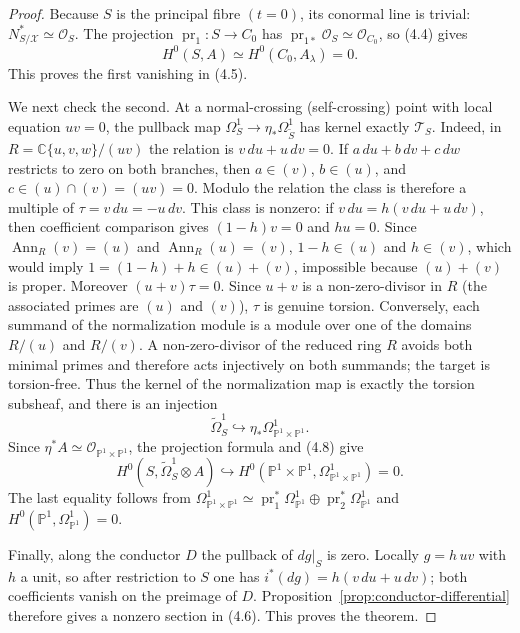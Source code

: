 \documentclass[11pt]{amsart}
\newcommand{\C}{\mathbb C}
\renewcommand{\P}{\mathbb P}
\newcommand{\cO}{\mathcal O}
\theoremstyle{plain}
\theoremstyle{definition}
\theoremstyle{remark}
\begin{document}
\begin{proof}
Because $S$ is the principal fibre $(t=0)$, its conormal line is trivial:
\(N^*_{S/\mathcal X}\simeq\cO_S\).  The projection
\(\operatorname{pr}_1:S\to C_0\) has
\(\operatorname{pr}_{1*}\cO_S\simeq\cO_{C_0}\), so (4.4) gives
\[
 H^0(S,A)\simeq H^0(C_0,A_\lambda)=0.
 \tag{4.7}
\]
This proves the first vanishing in (4.5).

We next check the second.  At a normal-crossing (self-crossing) point with local equation
\(uv=0\), the pullback map
\(\Omega^1_S\to\eta_*\Omega^1_{\widetilde S}\) has kernel exactly
\(\mathscr T_S\).  Indeed, in
\(R=\C\{u,v,w\}/(uv)\) the relation is
\(v\,du+u\,dv=0\).  If
\(a\,du+b\,dv+c\,dw\) restricts to zero on both branches, then
\(a\in(v)\), \(b\in(u)\), and
\(c\in(u)\cap(v)=(uv)=0\).  Modulo the relation the class is therefore a
multiple of $\tau=v\,du=-u\,dv$.  This class is nonzero: if
\(v\,du=h(v\,du+u\,dv)\), then coefficient comparison gives
  \((1-h)v=0\) and $hu=0$.  Since
\(\operatorname{Ann}_R(v)=(u)\) and \(\operatorname{Ann}_R(u)=(v)\),
\(1-h\in(u)\) and \(h\in(v)\), which would imply
\(1=(1-h)+h\in(u)+(v)\), impossible because $(u)+(v)$ is proper.
Moreover $(u+v)\tau=0$.  Since $u+v$ is a non-zero-divisor in
$R$ (the associated primes are $(u)$ and $(v)$), $\tau$ is genuine
torsion.
Conversely, each summand of the normalization module is a module over one of
the domains $R/(u)$ and $R/(v)$.  A non-zero-divisor of the reduced ring $R$
avoids both minimal primes and therefore acts injectively on both summands;
the target is torsion-free.  Thus the kernel of the normalization map is
exactly the torsion subsheaf, and there is an injection
\[
 \widetilde\Omega^1_S\hookrightarrow\eta_*\Omega^1_{\P^1\times\P^1}.
 \tag{4.8}
\]
Since $\eta^*A\simeq\cO_{\P^1\times\P^1}$, the projection formula and (4.8)
give
\[
 H^0(S,\widetilde\Omega^1_S\otimes A)
 \hookrightarrow
 H^0(\P^1\times\P^1,\Omega^1_{\P^1\times\P^1})=0.
 \tag{4.9}
\]
The last equality follows from
\(\Omega^1_{\P^1\times\P^1}\simeq
\operatorname{pr}_1^*\Omega^1_{\P^1}\oplus
\operatorname{pr}_2^*\Omega^1_{\P^1}\) and
\(H^0(\P^1,\Omega^1_{\P^1})=0\).

Finally, along the conductor $D$ the pullback of $dg|_S$ is zero.  Locally
$g=h\,uv$ with $h$ a unit, so after restriction to $S$ one has
$i^*(dg)=h(v\,du+u\,dv)$; both coefficients vanish on the preimage of $D$.
Proposition~\ref{prop:conductor-differential}
therefore gives a nonzero section in (4.6).  This proves the theorem.
\end{proof}
\end{document}
